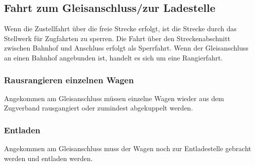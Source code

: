 \subsection{Fahrt zum Gleisanschluss/zur Ladestelle}
Wenn die Zustellfahrt über die freie Strecke erfolgt, ist die Strecke durch das Stellwerk für Zugfahrten zu sperren. Die Fahrt über den Streckenabschnitt zwischen Bahnhof und  Anschluss erfolgt  als  Sperrfahrt.  Wenn  der  Gleisanschluss  an einen Bahnhof  angebunden  ist,  handelt  es  sich  um  eine  Rangierfahrt.
\subsubsection{Rausrangieren einzelnen Wagen}
Angekommen am Gleisanschluss müssen einzelne Wagen wieder aus dem Zugverband rausgangiert oder zumindest abgekuppelt werden.
\subsubsection{Entladen}
Angekommen am Gleisanschluss muss der Wagen noch zur Entladestelle gebracht werden und entladen werden.